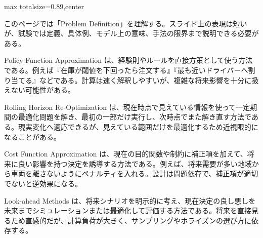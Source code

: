 \begin{minipage}[t]{0.58\textwidth}
\begin{adjustbox}{max totalsize={\textwidth}{0.89\textheight},center}
\begin{minipage}{\textwidth}\scriptsize
{}このページでは「Problem Definition」を理解する。スライド上の表現は短いが、試験では定義、具体例、モデル上の意味、手法の限界まで説明できる必要がある。\par
Policy Function Approximation は、経験則やルールを直接方策として使う方法である。例えば『在庫が閾値を下回ったら注文する』『最も近いドライバーへ割り当てる』などである。計算は速く解釈しやすいが、複雑な将来影響を十分に扱えない可能性がある。\par
Rolling Horizon Re-Optimization は、現在時点で見えている情報を使って一定期間の最適化問題を解き、最初の一部だけ実行し、次時点でまた解き直す方法である。現実変化へ適応できるが、見えている範囲だけを最適化するため近視眼的になることがある。\par
Cost Function Approximation は、現在の目的関数や制約に補正項を加えて、将来に良い影響を持つ決定を誘導する方法である。例えば、将来需要が多い地域から車両を離さないようにペナルティを入れる。設計は問題依存で、補正項が適切でないと逆効果になる。\par
Look-ahead Methods は、将来シナリオを明示的に考え、現在決定の良し悪しを未来までシミュレーションまたは最適化して評価する方法である。将来を直接見るため直感的だが、計算負荷が大きく、サンプリングやホライズンの選び方に依存する。\par

\end{minipage}
\end{adjustbox}
\end{minipage}
